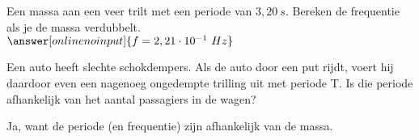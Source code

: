 \documentclass{ximera}
\begin{document}
    \begin{exercise} 
        Een massa aan een veer trilt met een periode van $3,20 \ s$. Bereken de frequentie als je de massa verdubbelt. \\
        $\answer[onlinenoinput]{f=2,21\cdot 10^{-1} \ Hz}$
        
    \end{exercise}
    
    \begin{exercise} 
        Een auto heeft slechte schokdempers. Als de auto door een put rijdt, voert hij daardoor even een nagenoeg ongedempte trilling uit met periode T. Is die periode afhankelijk van het aantal passagiers in de wagen?
        \begin{oplossing}
            Ja, want de periode (en frequentie) zijn afhankelijk van de massa.
        \end{oplossing}
    \end{exercise}
    
\end{document}
